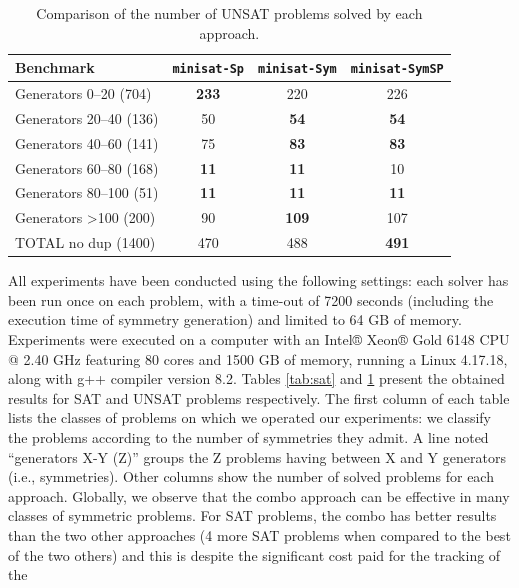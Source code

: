 \begin{table}\footnotesize
 \centering
 \begin{tabular}{l|ccc}
  \toprule
  Benchmark  &\texttt{minisat-Sp} & \texttt{minisat-Sym} & \texttt{minisat-SymSP}\\
  \hline 
  Generators 0–20 (704) & \cellcolor{gray!30,}\textbf{233}&220&226\\
  Generators 20–40 (136) & 50&\cellcolor{gray!30}\textbf{54}&\cellcolor{gray!30}\textbf{54}\\
  Generators 40–60 (141) & 75&\cellcolor{gray!30}\textbf{83}&\cellcolor{gray!30}\textbf{83}\\
  Generators 60–80 (168) & \cellcolor{gray!30}\textbf{11}&\cellcolor{gray!30}\textbf{11}&10\\
  Generators 80–100 (51) & \cellcolor{gray!30}\textbf{11}&\cellcolor{gray!30}\textbf{11}&\cellcolor{gray!30}\textbf{11}\\
  Generators \textgreater100 (200) & 90&\cellcolor{gray!30,}\textbf{109}&107\\
  \hline 
  TOTAL no dup (1400) & 470&488&\cellcolor{gray!30,}\textbf{491}\\
  \bottomrule
 \end{tabular}
 \caption{Comparison of the number of UNSAT problems solved by each approach.}
 \label{tab:unsat}
\end{table}
All experiments have been conducted using the following settings: each solver
has been run once on each problem, with a time-out of 7200 seconds (including
the execution time of symmetry generation) and limited to 64 GB of memory.
Experiments were executed on a computer with an Intel® Xeon® Gold 6148 CPU
@ 2.40 GHz featuring 80 cores and 1500 GB of memory, running a Linux 4.17.18,
along with g++ compiler version 8.2.
Tables \ref{tab:sat} and \ref{tab:unsat} present the obtained results for SAT
and UNSAT problems respectively. The first column of each table lists the
classes of problems on which we operated our experiments: we classify the
problems according to the number of symmetries they admit. A line noted
``generators X-Y (Z)'' groups the Z problems having between X and Y generators
(i.e., symmetries). Other columns show the number of solved problems for each
approach.
Globally, we observe that the combo approach can be effective in many classes
of symmetric problems. For SAT problems, the combo has better results than the
two other approaches (4 more SAT problems when compared to the best of the two
others) and this is despite the significant cost paid for the tracking of the
